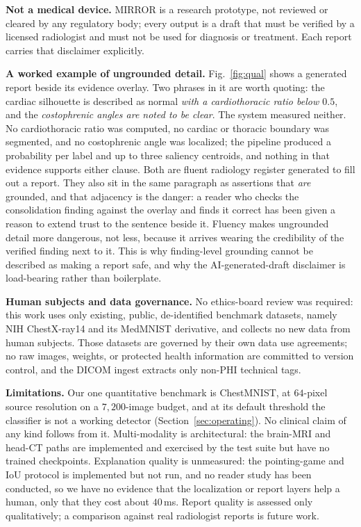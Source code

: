 \documentclass[conference]{IEEEtran}
\newcommand{\rih}[1]{\textbf{#1}\enspace\ignorespaces}
\begin{document}
\rih{Not a medical device.} MIRROR is a research prototype, not reviewed or cleared
by any regulatory body; every output is a draft that must be verified by a licensed
radiologist and must not be used for diagnosis or treatment. Each report carries
that disclaimer explicitly.

\rih{A worked example of ungrounded detail.} Fig.~\ref{fig:qual} shows a generated
report beside its evidence overlay. Two phrases in it are worth quoting: the cardiac
silhouette is described as normal \emph{with a cardiothoracic ratio below $0.5$},
and the \emph{costophrenic angles are noted to be clear}. The system measured
neither. No cardiothoracic ratio was computed, no cardiac or thoracic boundary was
segmented, and no costophrenic angle was localized; the pipeline produced a
probability per label and up to three saliency centroids, and nothing in that
evidence supports either clause. Both are fluent radiology register generated to
fill out a report. They also sit in the same paragraph as assertions that \emph{are}
grounded, and that adjacency is the danger: a reader who checks the consolidation
finding against the overlay and finds it correct has been given a reason to extend
trust to the sentence beside it. Fluency makes ungrounded detail more dangerous, not
less, because it arrives wearing the credibility of the verified finding next to it.
This is why finding-level grounding cannot be described as making a report safe, and
why the AI-generated-draft disclaimer is load-bearing rather than boilerplate.

\rih{Human subjects and data governance.} No ethics-board review was required: this
work uses only existing, public, de-identified benchmark datasets, namely NIH
ChestX-ray14 and its MedMNIST derivative, and collects no new data from human
subjects. Those datasets are governed by their own data use agreements; no raw
images, weights, or protected health information are committed to version control,
and the DICOM ingest extracts only non-PHI technical tags.

\rih{Limitations.} Our one quantitative benchmark is ChestMNIST, at $64$-pixel
source resolution on a $7{,}200$-image budget, and at its default threshold the
classifier is not a working detector (Section~\ref{sec:operating}). No clinical
claim of any kind follows from it. Multi-modality is architectural: the brain-MRI
and head-CT paths are implemented and exercised by the test suite but have no
trained checkpoints. Explanation quality is unmeasured: the pointing-game and IoU
protocol is implemented but not run, and no reader study has been conducted, so we
have no evidence that the localization or report layers help a human, only that they
cost about $40$\,ms. Report quality is assessed only qualitatively; a comparison
against real radiologist reports is future work.
\end{document}
